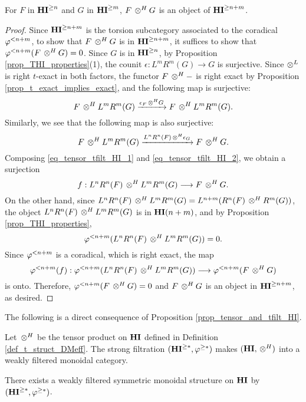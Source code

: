 \begin{prop}\label{prop_tensor_and_tfilt_HI}
For $F$ in $\THI{n}$ and $G$ in $\THI{m}$, $F \tHI G$
is an object of $\THI{n + m}$.
\end{prop}
\begin{proof}
Since $\THI{n + m}$ is the torsion subcategory associated to the
coradical $\tlHI{n + m}$, to show that $F \tHI G$ is in 
$\THI{n + m}$, it suffices to show that $\tlHI{n + m}(F \tHI G) = 
0$. Since $G$ is in $\THI{n}$, by Proposition 
\ref{prop_THI_properties}(1), the counit $\epsilon: L^mR^m(G) \to 
G$ is surjective. Since $\tDM$ is right $t$-exact in both factors, 
the functor $F \tHI -$ is right exact by Proposition 
\ref{prop_t_exact_implies_exact}, and the following map is surjective:
\begin{equation}\label{eq_tensor_tfilt_HI_1}
F \tHI L^mR^m(G) \xrightarrow{\epsilon_F \tHI G} F \tHI L^mR^m(G).
\end{equation}
Similarly, we see that the following map is
also surjective:
\begin{equation}\label{eq_tensor_tfilt_HI_2}
F \tHI L^mR^m(G) \xrightarrow{L^nR^n(F) \tHI \epsilon_G}
F \tHI G.
\end{equation}
Composing \eqref{eq_tensor_tfilt_HI_1} and 
\eqref{eq_tensor_tfilt_HI_2}, we obtain a surjection
\[
f: L^nR^n(F) \tHI L^mR^m(G) \to F \tHI G.
\]
On the other hand, since $L^nR^n(F) \tHI L^mR^m(G) = 
L^{n + m}(R^n(F) \tHI R^m(G))$, the object $L^nR^n(F) \tHI L^mR^m(G)$
is in $\LHI[n + m]{\HI}$, and by Proposition
\ref{prop_THI_properties}, 
\[
\tlHI{n + m}(L^nR^n(F) \tHI L^mR^m(G)) = 0. 
\]
Since $\tlHI{n + m}$ is a coradical, which is right exact, the map
\[
\tlHI{n + m}(f) : \tlHI{n + m}(L^nR^n(F) \tHI L^mR^m(G)) \to
   \tlHI{n + m}(F \tHI G)
\]
is onto. Therefore, $\tlHI{n + m}(F \tHI G) = 0$ and 
$F \tHI G$ is an object in $\THI{n + m}$, as desired.
\end{proof}

The following is a direct consequence of Proposition 
\ref{prop_tensor_and_tfilt_HI}.

\begin{cor}\label{cor_graded_tensor_HI}
  Let $\tHI$ be the tensor product on $\HI$ defined in Definition
  \ref{def_t_struct_DMeff}. The strong filtration $(\THI{*},
  \tgHI{*})$ makes $(\HI, \tHI)$ into a weakly filtered monoidal
  category.

 There exists a weakly filtered symmetric
  monoidal structure on $\HI$ by $(\THI{*}, \tgHI{*})$.
\end{cor}
